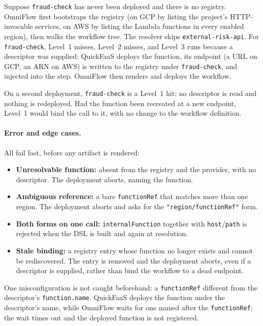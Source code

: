 Suppose \texttt{fraud-check} has never been deployed and there is no registry. OmniFlow first
bootstraps the registry (on GCP by listing the project's HTTP-invocable services, on AWS by listing
the Lambda functions in every enabled region), then walks the workflow tree. The resolver skips
\texttt{external-risk-api}. For \texttt{fraud-check}, Level~1 misses, Level~2 misses, and Level~3
runs because a descriptor was supplied: QuickFaaS deploys the function, its endpoint (a URL on GCP,
an ARN on AWS) is written to the registry under \texttt{fraud-check}, and injected into the step.
OmniFlow then renders and deploys the workflow.

On a second deployment, \texttt{fraud-check} is a Level~1 hit: no descriptor is read and nothing is
redeployed. Had the function been recreated at a new endpoint, Level~1 would bind the call to it,
with no change to the workflow definition.

\paragraph{Error and edge cases.}
All fail fast, before any artifact is rendered:
\begin{itemize}
  \item \textbf{Unresolvable function:} absent from the registry and the provider, with no
  descriptor. The deployment aborts, naming the function.
  \item \textbf{Ambiguous reference:} a bare \texttt{functionRef} that matches more than one region.
  The deployment aborts and asks for the \texttt{"region/functionRef"} form.
  \item \textbf{Both forms on one call:} \texttt{internalFunction} together with
  \texttt{host}/\texttt{path} is rejected when the DSL is built and again at resolution.
  \item \textbf{Stale binding:} a registry entry whose function no longer exists and cannot be
  rediscovered. The entry is removed and the deployment aborts, even if a descriptor is supplied,
  rather than bind the workflow to a dead endpoint.
\end{itemize}

One misconfiguration is not caught beforehand: a \texttt{functionRef} different from the
descriptor's \texttt{function.name}. QuickFaaS deploys the function under the descriptor's name,
while OmniFlow waits for one named after the \texttt{functionRef}; the wait times out and the
deployed function is not registered.
